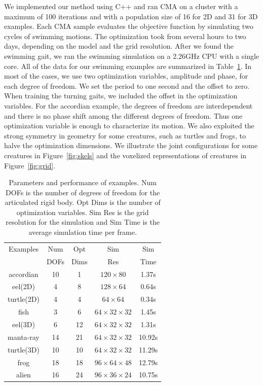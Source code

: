 We implemented our method using C++ and ran CMA on a cluster with a
maximum of 100 iterations and with a population size of 16 for 2D and 31 for 3D
examples. Each CMA sample evaluates the objective function by simulating
two cycles of swimming motions. The optimization took from several hours
to two days, depending on the model and the grid resolution. After we
found the swimming gait, we ran the swimming simulation on a 2.26GHz CPU
with a single core.  All of the data for our swimming examples are
summarized in Table~\ref{table:simData}. In most of the cases, we use two
optimization variables, amplitude and phase, for each degree of freedom.
We set the period to one second and the offset to zero. When training the
turning gaits, we included the offset in the optimization variables. For the
accordian example, the degrees of freedom are interdependent and there is
no phase shift among the different degrees of freedom. Thus one
optimization variable is enough to characterize its motion. We also
exploited the strong symmetry in geometry for some creatures, such as
turtles and frogs, to halve the optimization dimensions. We illustrate the
joint configurations for some creatures in Figure~\ref{fig:skels} and the voxelized representations of creatures in Figure~\ref{fig:grid}.

\begin{table}
  \centering
   \caption{Parameters and performance of examples. Num DOFs is the number of degrees of freedom for the articulated rigid body. Opt Dims is the number of optimization variables. Sim Res is the grid resolution for the simulation and Sim Time is the average simulation time per frame.}
\begin{tabular}{|c|c|c|c|c|}
\hline
Examples & Num & Opt  & Sim  & Sim\\
         & DOFs & Dims & Res & Time \\
 \hline
accordian & 10 & 1 &  $120\times 80$           & 1.37s\\
eel(2D)   & 4  & 8 &  $128 \times 64$         &  0.64s \\
turtle(2D)& 4  & 4 & $64\times 64$           & 0.34s \\
fish      & 3  & 6  & $64\times 32\times 32$  & 1.45s\\
eel(3D)   & 6  & 12 &  $64\times 32\times 32$ & 1.31s\\
manta-ray & 14 & 21 &  $64\times 32\times 32$ & 10.92s\\
turtle(3D)& 10 & 10 &  $64\times 32\times 32$ & 11.29s\\
frog      & 18 & 18 &  $96\times 64\times 48$ & 12.79s\\
alien     & 16 & 24 &  $96\times 36\times 24$ & 10.75s\\

\hline
 \end{tabular}
 \label{table:simData}
 \end{table}

